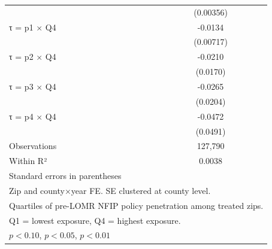 \begin{table}[htbp]
\begin{tabular}{l*{1}{c}}
                    &   (0.00356)         \\
[1em]
τ = p1 × Q4         &     -0.0134\sym{*}  \\
                    &   (0.00717)         \\
[1em]
τ = p2 × Q4         &     -0.0210         \\
                    &    (0.0170)         \\
[1em]
τ = p3 × Q4         &     -0.0265         \\
                    &    (0.0204)         \\
[1em]
τ = p4 × Q4         &     -0.0472         \\
                    &    (0.0491)         \\
\hline
Observations        &     127,790         \\
Within R²           &      0.0038         \\
\hline\hline
\multicolumn{2}{l}{\footnotesize Standard errors in parentheses}\\
\multicolumn{2}{l}{\footnotesize Zip and county×year FE. SE clustered at county level.}\\
\multicolumn{2}{l}{\footnotesize Quartiles of pre-LOMR NFIP policy penetration among treated zips.}\\
\multicolumn{2}{l}{\footnotesize Q1 = lowest exposure, Q4 = highest exposure.}\\
\multicolumn{2}{l}{\footnotesize \sym{*} \(p<0.10\), \sym{**} \(p<0.05\), \sym{***} \(p<0.01\)}\\
\end{tabular}
\end{table}
